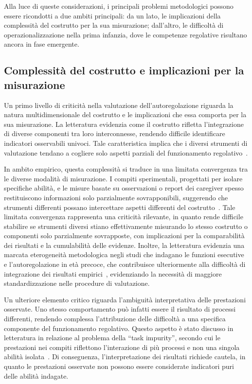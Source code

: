         Alla luce di queste considerazioni, i principali problemi metodologici possono essere ricondotti a due ambiti principali: da un lato, le implicazioni della complessità del costrutto per la sua misurazione; dall'altro, le difficoltà di operazionalizzazione nella prima infanzia, dove le competenze regolative risultano ancora in fase emergente.

        \subsection{Complessità del costrutto e implicazioni per la misurazione}
        \label{sec:3_1_1}

            Un primo livello di criticità nella valutazione dell'autoregolazione riguarda la natura multidimensionale del costrutto e le implicazioni che essa comporta per la sua misurazione. La letteratura evidenzia come il costrutto rifletta l'integrazione di diverse componenti tra loro interconnesse, rendendo difficile identificare indicatori osservabili univoci. Tale caratteristica implica che i diversi strumenti di valutazione tendano a cogliere solo aspetti parziali del funzionamento regolativo~\cite{diamond2013,nigg2017}.

            In ambito empirico, questa complessità si traduce in una limitata convergenza tra le diverse modalità di misurazione. I compiti sperimentali, progettati per isolare specifiche abilità, e le misure basate su osservazioni o report dei caregiver spesso restituiscono informazioni solo parzialmente sovrapponibili, suggerendo che strumenti differenti possano intercettare aspetti differenti del costrutto~\cite{toplak2013,snyder2021}. Tale limitata convergenza rappresenta una criticità rilevante, in quanto rende difficile stabilire se strumenti diversi stiano effettivamente misurando lo stesso costrutto o componenti solo parzialmente sovrapposte, con implicazioni per la comparabilità dei risultati e la cumulabilità delle evidenze. Inoltre, la letteratura evidenzia una marcata eterogeneità metodologica negli studi che indagano le funzioni esecutive e l'autoregolazione in età precoce, che contribuisce ulteriormente alla difficoltà di integrazione dei risultati empirici~\cite{berni2025}, evidenziando la necessità di maggiore standardizzazione nelle procedure di valutazione.

            Un ulteriore elemento critico riguarda l'ambiguità interpretativa delle prestazioni osservate. Uno stesso comportamento può infatti essere il risultato di processi differenti, rendendo complessa l'attribuzione delle difficoltà a una specifica componente del funzionamento regolativo. Questo aspetto è stato discusso in letteratura in relazione al problema della ``task impurity'', secondo cui le prestazioni nei compiti riflettono l'interazione di più processi e non una singola abilità isolata~\cite{miyake2012,hughes2002}. Di conseguenza, l'interpretazione dei risultati richiede cautela, in quanto le prestazioni osservate non possono essere considerate indicatori puri delle abilità indagate.

